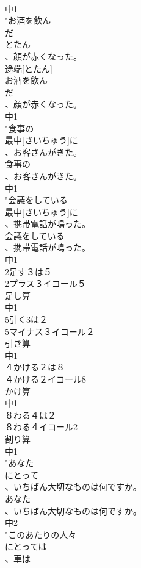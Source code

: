 \documentclass[8pt]{extreport}
\begin{document}
\begin{CJK}{UTF8}{min}
\\	中1
\\	"お酒を飲ん
\\	だ
\\	とたん
\\	、顔が赤くなった。　
\\	途端[とたん]
\\	お酒を飲ん
\\	だ
\\	、顔が赤くなった。
\\	中1
\\	"食事の
\\	最中[さいちゅう]に
\\	、お客さんがきた。
\\	食事の
\\	、お客さんがきた。
\\	中1
\\	"会議をしている
\\	最中[さいちゅう]に
\\	、携帯電話が鳴った。
\\	会議をしている
\\	、携帯電話が鳴った。
\\	中1
\\	2足す３は５
\\	2プラス３イコール５
\\	足し算　
\\	中1
\\	5引く3は２
\\	5マイナス３イコール２
\\	引き算　
\\	中1
\\	４かける２は８
\\	４かける２イコール8
\\	かけ算　
\\	中1
\\	８わる４は２
\\	８わる４イコール2
\\	割り算　
\\	中1
\\	"あなた
\\	にとって
\\	、いちばん大切なものは何ですか。
\\	あなた
\\	、いちばん大切なものは何ですか。
\\	中2
\\	"このあたりの人々
\\	にとっては
\\	、車は

\end{CJK}
\end{document}
